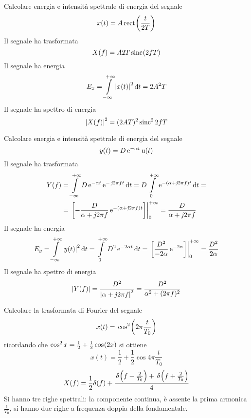 \begin{esercizio}
Calcolare energia e intensità spettrale di energia del segnale
\[x(t)=A\rect{\frac{t}{2T}}\]
Il segnale ha trasformata 
\[X(f)=A 2 T \sinc{2 f T}\]
Il segnale ha energia
\[E_x=\intinf{\abs{x(t)}^2}{t}=2 A^2 T\]
Il segnale ha spettro di energia
\[\abs{X(f)}^2=(2 A T)^2\Sinc^2{2 f T}\]
\end{esercizio}

\begin{esercizio}
Calcolare energia e intensità spettrale di energia del segnale
\[y(t)=D\e{-\alpha t}\step(t)\]
Il segnale ha trasformata
\begin{align*}
Y(f)&=\intinf{ D\e{-\alpha t}\e{-\imath 2\pi f t}}{t}=D\intd{0}{+\infty}{\e{-(\alpha+\imath 2\pi f)t}}{t}=\\
&=\bound{0}{+\infty}{-\frac{D}{\alpha+\imath 2\pi f}\e{-(\alpha+\imath 2\pi f)t}}=\frac{D}{\alpha+\imath 2\pi f}
\end{align*}
Il segnale ha energia
\[E_y=\intinf{\abs{y(t)}^2}{t}=\intd{0}{+\infty}{D^2\e{-2\alpha t}}{t}=\bound{0}{+\infty}{\frac{D^2}{-2\alpha}\e{-2\alpha}}=\frac{D^2}{2\alpha}\]
Il segnale ha spettro di energia
\[\abs{Y(f)}=\frac{D^2}{\abs{\alpha+\imath 2\pi f}^2}=\frac{D^2}{\alpha^2+(2\pi f)^2}\]
\end{esercizio}

\begin{esercizio}
Calcolare la trasformata di Fourier del segnale
\[x(t)=\f{\Cos^2}{2\pi\frac{t}{T_0}}\]
ricordando che $\Cos^2 x=\frac{1}{2}+\frac{1}{2}\cos{2x}$ si ottiene
\[x(t)=\frac{1}{2}+\frac{1}{2}\cos{4\pi\frac{t}{T_0}}\]
\[X(f)=\frac{1}{2}\delta(f)+\frac{\f{\delta}{f-\frac{2}{T_0}}+\f{\delta}{f+\frac{2}{T_0}}}{4}\]
Si hanno tre righe spettrali: la componente continua, è assente la prima armonica $\frac{1}{T_0}$, si hanno due righe a frequenza doppia della fondamentale.
\begin{figure}[!ht]
\centering
{}
\end{figure}
\end{esercizio}
